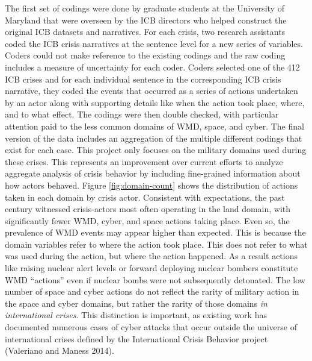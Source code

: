 \documentclass[
]{article}
\begin{document}
The first set of codings were done by graduate students at the University of Maryland that were overseen by the ICB directors who helped construct the original ICB datasets and narratives. For each crisis, two research assistants coded the ICB crisis narratives at the sentence level for a new series of variables. Coders could not make reference to the existing codings and the raw coding includes a measure of uncertainty for each coder. Coders selected one of the 412 ICB crises and for each individual sentence in the corresponding ICB crisis narrative, they coded the events that occurred as a series of actions undertaken by an actor along with supporting details like when the action took place, where, and to what effect. The codings were then double checked, with particular attention paid to the less common domains of WMD, space, and cyber. The final version of the data includes an aggregation of the multiple different codings that exist for each case. This project only focuses on the military domains used during these crises. This represents an improvement over current efforts to analyze aggregate analysis of crisis behavior by including fine-grained information about how actors behaved. Figure \ref{fig:domain-count} shows the distribution of actions taken in each domain by crisis actor. Consistent with expectations, the past century witnessed crisis-actors most often operating in the land domain, with significantly fewer WMD, cyber, and space actions taking place. Even so, the prevalence of WMD events may appear higher than expected. This is because the domain variables refer to where the action took place. This does not refer to what was used during the action, but where the action happened. As a result actions like raising nuclear alert levels or forward deploying nuclear bombers constitute WMD ``actions'' even if nuclear bombs were not subsequently detonated. The low number of space and cyber actions do not reflect the rarity of military action in the space and cyber domains, but rather the rarity of those domains \textit{in international crises}. This distinction is important, as existing work has documented numerous cases of cyber attacks that occur outside the universe of international crises defined by the International Crisis Behavior project (Valeriano and Maness 2014).
\end{document}
